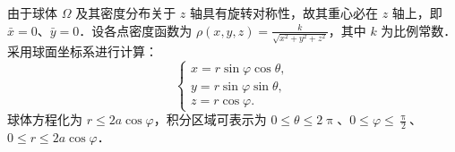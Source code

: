 \begin{solution}
    由于球体 $\Omega$ 及其密度分布关于 $z$ 轴具有旋转对称性，故其重心必在 $z$ 轴上，即 $\bar{x} = 0$、$\bar{y} = 0$．设各点密度函数为 $\rho(x, y, z) = \frac{k}{\sqrt{x^2 + y^2 + z^2}}$，其中 $k$ 为比例常数．采用球面坐标系进行计算：
    \begin{equation}
        \label{eq:Coordinate-Transformation-1}
        \begin{cases}
            x = r \sin \varphi \cos \theta, \\
            y = r \sin \varphi \sin \theta, \\
            z = r \cos \varphi.
        \end{cases}
    \end{equation}
    球体方程化为 $r \le 2a \cos \varphi$，积分区域可表示为 $0 \le \theta \le 2\uppi$、$0 \le \varphi \le \frac{\uppi}{2}$、$0 \le r \le 2a \cos \varphi$．


\end{solution}
